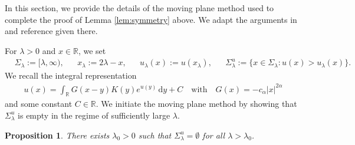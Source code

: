 \documentclass[reqno,10pt,a4paper]{amsart}
\newtheorem{prop}{Proposition}[section]
\theoremstyle{definition}
\theoremstyle{definition}
\theoremstyle{remark}
\theoremstyle{remark}
\numberwithin{equation}{section}
\newcommand{\R}{\mathbb{R}}
\begin{document}
\begin{appendix}
\label{sec:moving_plane}

In this section, we provide the details of the moving plane method used to complete the proof of Lemma \ref{lem:symmetry} above. We adapt the arguments in \cite{AhLe-22} and reference given there.

For $\lambda > 0$ and $x\in \R$, we set 
\begin{align*}
    &\Sigma_\lambda := [\lambda
    ,\infty), &  &x_\lambda := 2\lambda -x 
    , & &u_\lambda(x) := u(x_\lambda), & &\Sigma_\lambda^u := \{x\in \Sigma_\lambda : u(x) > u_\lambda(x) \}.
\end{align*}
We recall the integral representation \begin{align*}
    u(x) = \int_\mathbb{R} G(x-y) K(y) e^{u(y)} \, \mathrm{d}y + C \quad \mbox{with} \quad G(x) = -c_\alpha |x|^{2 \alpha}
\end{align*}
and some constant $C \in \mathbb{R}$. We initiate the moving plane method by showing that $\Sigma_\lambda^u$ is empty in the regime of sufficiently large $\lambda$.

\begin{prop}\label{prop:movingplane1}
    There exists $\lambda_0 > 0$ such that $\Sigma_\lambda^u = \emptyset$ for all $\lambda > \lambda_0$.
\end{prop}


\end{appendix}
\end{document}
